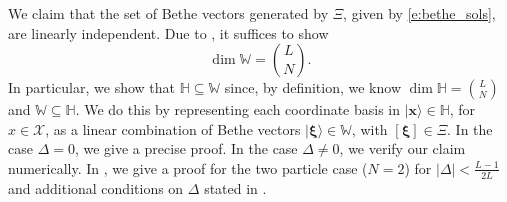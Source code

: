 \documentclass[a4paper,11pt]{article}
\theoremstyle{definition}
\begin{document}
We claim that the set of Bethe vectors generated by $\Xi$, given by \eqref{e:bethe_sols}, are linearly independent. Due to , it suffices to show
\begin{equation}
    \dim \mathbb{W} = \binom{L}{N}.
\end{equation}
In particular, we show that $\mathbb{H} \subseteq \mathbb{W}$ since, by definition, we know $\dim \mathbb{H} = \binom{L}{N}$ and $\mathbb{W} \subseteq \mathbb{H}$. We do this by representing each coordinate basis in $|\mathbf{x} \rangle \in \mathbb{H}$, for $x \in \mathcal{X}$, as a linear combination of Bethe vectors $| \boldsymbol{\xi} \rangle \in \mathbb{W}$, with $[\boldsymbol{\xi}] \in \Xi$. In the case $\Delta =0$, we give a precise proof. In the case $\Delta\neq0$, we verify our claim numerically. In , we give a proof for the two particle case ($N=2$) for $|\Delta|<\frac{L-1}{2L}$ and additional conditions on $\Delta$ stated in . 
\end{document}
